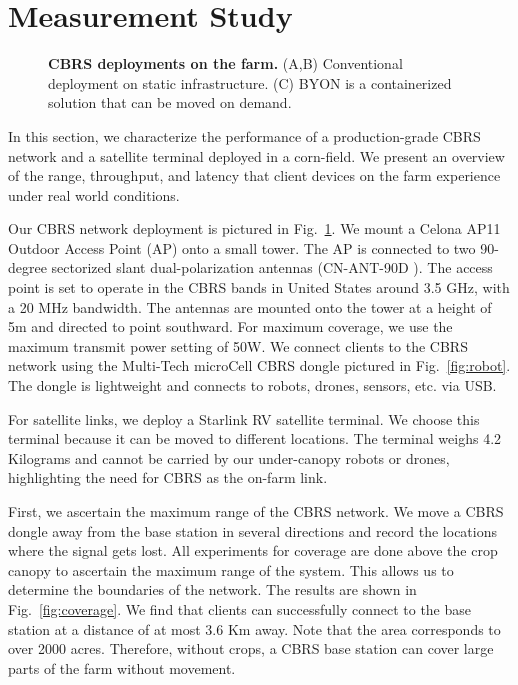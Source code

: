 \section{Measurement Study}
\label{sec:measurements}

\begin{figure}[ht!] %
  \centering
  \vspace{-0.15in}
  \caption{\textbf{CBRS deployments on the farm.} (A,B) Conventional deployment on static infrastructure. (C) BYON is a containerized solution that can be moved on demand. } 
  \label{fig:deployment}
  \vspace{-0.25in}
\end{figure}

In this section, we characterize the performance of a production-grade CBRS network and a satellite terminal deployed in a corn-field. We present an overview of the range, throughput, and latency that client devices on the farm experience under real world conditions.

 Our CBRS network deployment is pictured in Fig.~\ref{fig:deployment}. We mount a Celona AP11 Outdoor Access Point (AP) \cite{celona_ap11} onto a small  tower. The AP is connected to two 90-degree sectorized slant dual-polarization antennas (CN-ANT-90D \cite{celona_antenna}). The access point is set to operate in the CBRS bands in United States around 3.5 GHz, with a 20 MHz bandwidth. The antennas are mounted onto the tower at a height of 5m and directed to point southward. For maximum coverage, we use the maximum transmit power setting of 50W. We connect clients to the CBRS network using the Multi-Tech microCell CBRS dongle \cite{multitech_multiconnect} pictured in Fig.~\ref{fig:robot}. The dongle is lightweight and connects to robots, drones, sensors, etc. via USB.

For satellite links, we deploy a Starlink RV satellite terminal. We choose this terminal because it can be moved to different locations. The terminal weighs 4.2 Kilograms and cannot be carried by our under-canopy robots or drones, highlighting the need for CBRS as the on-farm link.

 First, we ascertain the maximum range of the CBRS network. We move a CBRS dongle away from the base station in several directions and record the locations where the signal gets lost. All experiments for coverage are done above the crop canopy to ascertain the maximum range of the system. This allows us to determine the boundaries of the network. The results are shown in Fig.~\ref{fig:coverage}. We find that clients can successfully connect to the base station at a distance of at most 3.6 Km away. Note that the area corresponds to over 2000 acres. Therefore, without crops, a CBRS base station can cover large parts of the farm without movement. %

